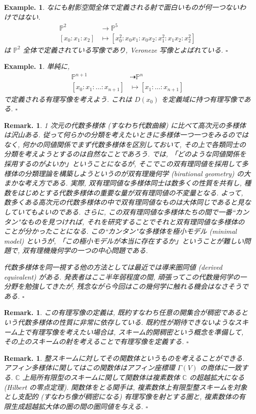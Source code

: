 \documentclass[openany, a4paper, oneside]{jsbook}
\theoremstyle{break}
\theoremstyle{breakdefn}
\newtheorem{ex}[thm]{Example.}
\newtheorem{rem}[thm]{Remark.}
\newcommand{\fin}{\hfill $\square$ \par}
\newcommand{\map}{\longrightarrow}
\begin{document}
\begin{ex}
なにも射影空間全体で定義される射で面白いものが何一つないわけではない.
\begin{align}
 \mathbb{P}^2
 &\map
 \mathbb{P}^5 \\
 [x_0:x_1:x_2]
 &\longmapsto
 [x_0^2:x_0x_1:x_0x_2:x_1^2:x_1x_2:x_2^2]
\end{align}
は $\mathbb{P}^2$ 全体で定義されている写像であり, Veroneze 写像とよばれている. \fin
\end{ex}
\begin{ex}
単純に,
\begin{align}
 \mathbb{P}^{n+1}
 &\dashrightarrow
 \mathbb{P}^n \\
 [x_0:x_1:\dots:x_{n+1}]
 &\longmapsto
 [x_1:\dots:x_{n+1}]
\end{align}
で定義される有理写像を考えよう.
これは $D (x_0)$ を定義域に持つ有理写像である. \fin
\end{ex}

\begin{rem}
1 次元の代数多様体 (すなわち代数曲線) に比べて高次元の多様体は沢山ある.
従って何らかの分類を考えたいときに多様体一つ一つをみるのではなく,
何かの同値関係でまず代数多様体を区別しておいて,
その上で各類同士の分類を考えようとするのは自然なことであろう.
では, 「どのような同値関係を採用するのがよいか」ということになるが,
そこでこの双有理同値を採用して多様体の分類理論を構築しようというのが双有理幾何学 (birational geometry) の大まかな考え方である.
実際, 双有理同値な多様体同士は数多くの性質を共有し, 種数をはじめとする代数多様体の重要な量が双有理同値の不変量となる.
よって, 数多くある高次元の代数多様体の中で双有理同値なものは大体同じであると見なしていてもよいのである.
さらに, この双有理同値な多様体たちの間で一番``カンタン"なものを見つければ,
それを研究することでそれと双有理同値な多様体のことが分かったことになる.
この``カンタン"な多様体を極小モデル (minimal model) というが,
「この極小モデルが本当に存在するか」ということが難しい問題で, 双有理機幾何学の一つの中心問題である.

代数多様体を同一視する他の方法としては最近では導来圏同値 (derived equivalent) がある.
発表者はここ半年弱程度の間, 頑張ってこの代数幾何学の一分野を勉強してきたが,
残念ながら今回はこの幾何学に触れる機会はなさそうである. \fin
\end{rem}
\begin{rem}
この有理写像の定義は, 既約すなわち任意の開集合が稠密であるという代数多様体の性質に非常に依存している.
既約性が期待できないようなスキーム上で有理写像を考えたい場合は,
スキーム的開稠密という概念を準備して, その上のスキームの射を考えることで有理写像を定義する. \fin
\end{rem}
\begin{rem}
整スキームに対してその関数体というものを考えることができる.
アフィン多様体に関してはこの関数体はアフィン座標環 $\Gamma (V)$ の商体に一致する.
$\mathbb{C}$ 上局所有限型のスキームに関して関数体は複素数体 $\mathbb{C}$ の超越拡大になる (Hilbert の零点定理).
関数体をとる関手は, 複素数体上有限型整スキームを対象とし支配的 (すなわち像が稠密になる) 有理写像を射とする圏と,
複素数体の有限生成超越拡大体の圏の間の圏同値を与える. \fin
\end{rem}
\end{document}
